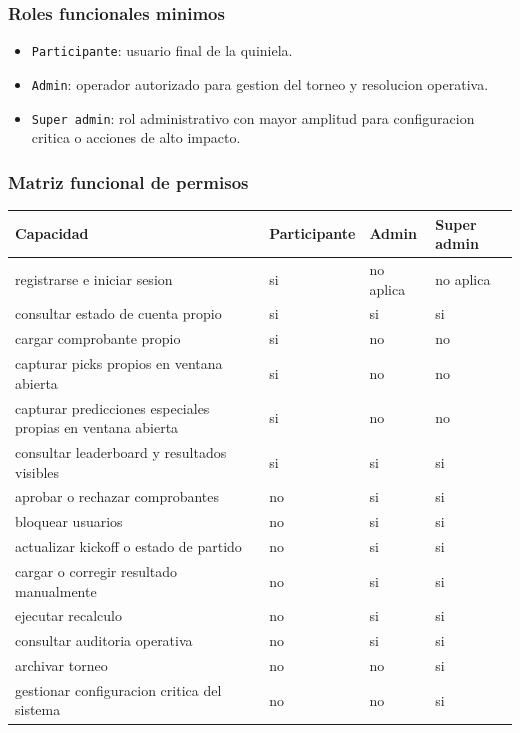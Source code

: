\subsubsection{Roles funcionales minimos}

\begin{itemize}
  \item \texttt{Participante}: usuario final de la quiniela.
  \item \texttt{Admin}: operador autorizado para gestion del torneo y resolucion operativa.
  \item \texttt{Super admin}: rol administrativo con mayor amplitud para configuracion critica o acciones de alto impacto.
\end{itemize}

\subsubsection{Matriz funcional de permisos}

\begin{longtable}{p{}p{}p{}p{}}
\toprule
\textbf{Capacidad} & \textbf{Participante} & \textbf{Admin} & \textbf{Super admin} \\
\midrule
registrarse e iniciar sesion & si & no aplica & no aplica \\
consultar estado de cuenta propio & si & si & si \\
cargar comprobante propio & si & no & no \\
capturar picks propios en ventana abierta & si & no & no \\
capturar predicciones especiales propias en ventana abierta & si & no & no \\
consultar leaderboard y resultados visibles & si & si & si \\
aprobar o rechazar comprobantes & no & si & si \\
bloquear usuarios & no & si & si \\
actualizar kickoff o estado de partido & no & si & si \\
cargar o corregir resultado manualmente & no & si & si \\
ejecutar recalculo & no & si & si \\
consultar auditoria operativa & no & si & si \\
archivar torneo & no & no & si \\
gestionar configuracion critica del sistema & no & no & si \\
\bottomrule
\end{longtable}

